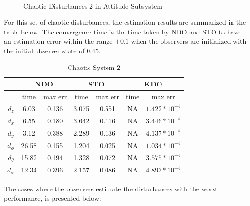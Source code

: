 \documentclass[letterpaper%
, twoside%
, 12pt%
,memoire%
, english%
,creativecommons,hyperref%
]{thETS}
\begin{document}
\begin{figure}[H]
\centering
{}
\\ \parbox{0.75\textwidth}{\caption{Chaotic Disturbances 2 in Attitude Subsystem} \label{dis_m2_att}}
\end{figure}

For this set of chaotic disturbances, the estimation results are summarized in the table below. The convergence time is the time taken by NDO and STO to have an estimation error within the range $\pm0.1$ when the observers are initialized with the initial observer state of 0.45. 

\begin{table}[!htbp]
\centering
\caption{Chaotic System 2}
\begin{tabular}{|c|c|c|c|c|c|c|}
\hline
{}  &  \multicolumn{2}{c|}{NDO} & \multicolumn{2}{c|}{STO} & \multicolumn{2}{c|}{KDO}\\
\hline
{}        &   time  & max err  & time  & max err& time  & max err\\
$d_z$     &  6.03 & 0.136   & 3.075  & 0.551 & NA     & $1.422*10^{-4}$\\
$d_x$     &  6.55 & 0.180   & 3.642  & 0.116 & NA     & $3.446*10^{-4}$\\
$d_y$     &  3.12 & 0.388   & 2.289  & 0.136 & NA     & $4.137*10^{-4}$\\
$d_\phi$  &  26.58& 0.155   & 1.204  & 0.025 & NA     & $1.034*10^{-4}$\\
$d_\theta$&  15.82& 0.194   & 1.328  & 0.072 & NA     & $3.575*10^{-4}$\\
$d_\psi$  &  12.34& 0.396   & 2.157  & 0.086 & NA     & $4.893*10^{-4}$\\

\hline
\end{tabular}
\end{table}

The cases where the observers estimate the disturbances with the worst performance, is presented below:
\end{document}
